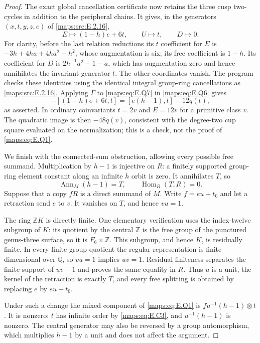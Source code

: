 \begin{proof}
The exact global cancellation certificate now retains
the three cusp two-cycles in addition to the peripheral
chains.  It gives, in the generators $(x,t,y,z,e)$ of
\ref{maps:src:E.2.16},
\[
 E\longmapsto(1-h)e+6t,\qquad
 U\longmapsto t,\qquad D\longmapsto0.
 \tag{E.Q7}\label{maps:eq:E.Q7}
\]
For clarity, before the last relation reductions its
$t$ coefficient for $E$ is
$-3h+4ha+4ha^2+h^2$, whose augmentation is six;
its free coefficient is $1-h$.  Its coefficient for $D$
is $2h^{-1}a^2-1-a$, which has augmentation zero and hence
annihilates the invariant generator $t$.  The other
coordinates vanish.  The program
 checks these identities
using the identical integral group-ring cancellations as
\ref{maps:src:E.2.16}.  Applying $\Gamma$ to \eqref{maps:eq:E.Q7} in \eqref{maps:eq:E.Q6} gives
\[
 -[(1-h)e+6t,t]
                =[e(h-1),t]-12q(t),
\]
as asserted.  In ordinary coinvariants $t=2v$ and
$E=12v$ for a primitive class $v$.  The quadratic image
is then $-48q(v)$, consistent with the degree-two cup
square evaluated on the normalization; this is a check,
not the proof of \eqref{maps:eq:E.Q1}.

We finish with the connected-sum obstruction, allowing
every possible free summand.  Multiplication by $h-1$
is injective on $R$: a finitely supported group-ring
element constant along an infinite $h$ orbit is zero.
It annihilates $T$, so
\[
 \operatorname{Ann}_M(h-1)=T,
                       \qquad\operatorname{Hom}_R(T,R)=0.
 \tag{E.Q8}\label{maps:eq:E.Q8}
\]
Suppose that a copy $fR$ is a direct summand of $M$.
Write $f=eu+t_0$ and let a retraction send $e$ to $v$.
It vanishes on $T$, and hence $vu=1$.

The ring $\mathbb ZK$ is directly finite.  One elementary
verification uses the index-twelve subgroup of $K$:
its quotient by the central $\mathbb Z$ is the free group
of the punctured genus-three surface, so it is
$F_6\times\mathbb Z$.  This subgroup, and hence $K$, is
residually finite.  In every finite-group quotient the
regular representation is finite dimensional over
$\mathbb Q$, so $vu=1$ implies $uv=1$.  Residual
finiteness separates the finite support of $uv-1$ and
proves the same equality in $R$.  Thus $u$ is a unit,
the kernel of the retraction is exactly $T$, and every
free splitting is obtained by replacing $e$ by
$eu+t_0$.

Under such a change the mixed component of \eqref{maps:eq:E.Q1} is
$f u^{-1}(h-1)\otimes t$.  It is nonzero: $t$ has
infinite order by \eqref{maps:eq:E.C3}, and $u^{-1}(h-1)$ is nonzero.
The central generator may also be reversed by a group
automorphism, which multiplies $h-1$ by a unit and
does not affect the argument.


\end{proof}
